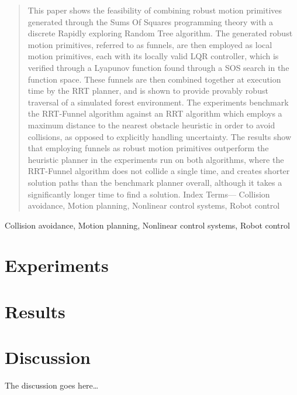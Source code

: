 \documentclass{IEEEtran}
\newcommand{\0}{\mathbf{0}}
\newcommand{\1}{\mathbf{1}}
\begin{document}
\begin{abstract}
  This paper shows the feasibility of combining robust motion primitives
  generated through the Sums Of Squares programming theory with a discrete
  Rapidly exploring Random Tree algorithm. The generated robust motion
  primitives, referred to as funnels, are then employed as local motion
  primitives, each with its locally valid LQR controller, which is verified
  through a Lyapunov function found through a SOS search in the function space.
  These funnels are then combined together at execution time by the RRT planner,
  and is shown to provide provably robust traversal of a simulated forest
  environment. The experiments benchmark the RRT-Funnel algorithm against an RRT
  algorithm which employs a maximum distance to the nearest obstacle heuristic
  in order to avoid collisions, as opposed to explicitly handling uncertainty.
  The results show that employing funnels as robust motion primitives outperform
  the heuristic planner in the experiments run on both algorithms, where the
  RRT-Funnel algorithm does not collide a single time, and creates shorter
  solution paths than the benchmark planner overall, although it takes a
  significantly longer time to find a solution. Index Terms— Collision
  avoidance, Motion planning, Nonlinear control systems, Robot control
\end{abstract}

\begin{IEEEkeywords}
  Collision avoidance, Motion planning, Nonlinear control systems, Robot control
\end{IEEEkeywords}



\label{sec:Method}



\section{Experiments}
\label{sec:Experiments}


\section{Results}


\section{Discussion}

The discussion goes here\ldots
\end{document}
